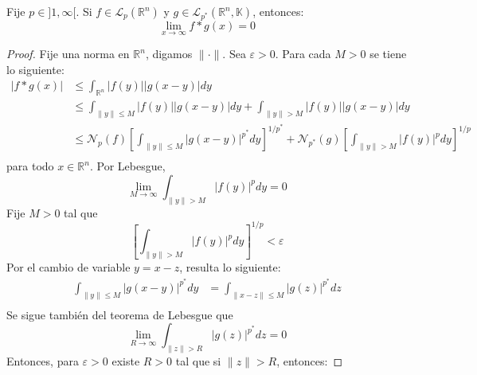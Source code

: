 \documentclass[12pt]{report}
\theoremstyle{largebreak}
\newcommand\abs[1]{\ensuremath{\big|#1\big|}}
\newcommand\norm[1]{\ensuremath{\|#1\|}}
\newcommand{\N}[2]{\ensuremath{\mathcal{N}_{#1}\left(#2\right)}}
\begin{document}
    \begin{propo}
        Fije $p\in]1,\infty[$. Si $f\in\mathcal{L}_p(\mathbb{R}^n)$ y $g\in\mathcal{L}_{ p^*}(\mathbb{R}^n,\mathbb{K})$, entonces:
        \begin{equation*}
            \lim_{x\rightarrow\infty}f*g(x)=0
        \end{equation*}
    \end{propo}

    \begin{proof}
        Fije una norma en $\mathbb{R}^n$, digamos $\norm{\cdot}$. Sea $\varepsilon>0$. Para cada $M>0$ se tiene lo siguiente:
        \begin{equation*}
            \begin{split}
                \abs{f*g(x)}&\leq\int_{\mathbb{R}^n}\abs{f(y)}\abs{g(x-y)}dy\\
                &\leq\int_{ \norm{y}\leq M}\abs{f(y)}\abs{g(x-y)}dy+\int_{ \norm{y}> M}\abs{f(y)}\abs{g(x-y)}dy\\
                &\leq\N{p}{f}\left[\int_{ \norm{y}\leq M}\abs{g(x-y)}^{ p^*}dy\right]^{ 1/p^*}+\N{p^*}{g}\left[\int_{ \norm{y}>M}\abs{f(y)}^pdy \right]^{1/p}\\
            \end{split}
        \end{equation*}
        para todo $x\in\mathbb{R}^n$. Por Lebesgue,
        \begin{equation*}
            \lim_{ M\rightarrow\infty}\int_{\norm{y}>M}\abs{f(y)}^pdy=0
        \end{equation*}
        Fije $M>0$ tal que
        \begin{equation*}
            \left[\int_{ \norm{y}>M}\abs{f(y)}^pdy \right]^{1/p}<\varepsilon
        \end{equation*}
        Por el cambio de variable $y=x-z$, resulta lo siguiente:
        \begin{equation*}
            \begin{split}
                \int_{\norm{y}\leq M }\abs{g(x-y)}^{ p^*}dy&=\int_{\norm{x-z}\leq M }\abs{g(z)}^{ p^*}dz\\
            \end{split}
        \end{equation*}
        Se sigue también del teorema de Lebesgue que
        \begin{equation*}
            \lim_{ R\rightarrow\infty}\int_{ \norm{z}>R}\abs{g(z)}^{p^*}dz=0
        \end{equation*}
        Entonces, para $\varepsilon>0$ existe $R>0$ tal que si $\norm{z}>R$, entonces:

\end{proof}
\end{document}
